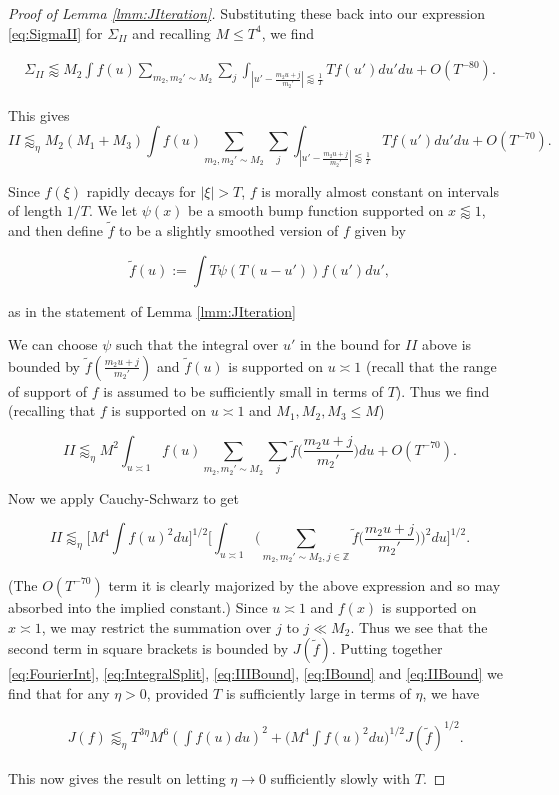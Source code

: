 \documentclass{amsart}
\theoremstyle{plain}
\numberwithin{equation}{section}
\renewcommand{\tilde}{\widetilde}
\begin{document}
\begin{proof}[Proof of  Lemma \ref{lmm:JIteration}]
Substituting these back into our expression \eqref{eq:SigmaII} for $\Sigma_{II}$ and recalling $M\le T^4$, we find

\begin{align*}
\Sigma_{II}\lessapprox M_2\int f(u) \sum_{m_2, m_2' \sim M_2}\sum_{j}   \int_{|u' - \frac{m_2 u + j}{m_2'} | \lessapprox \frac{1}{T}} T f(u') du' du+O(T^{-80}).
\end{align*}

This gives
\[ II\lessapprox_\eta M_2 (M_1 + M_3)  \int f(u)  \sum_{m_2, m_2' \sim M_2}\sum_{j}  \int_{|u' - \frac{m_2 u + j}{m_2'} | \lessapprox \frac{1}{T}}  T f(u') du' du+O(T^{-70}). \]

Since $\widehat{f}(\xi)$ rapidly decays for $|\xi|>T$, $f$ is morally almost constant on intervals of length $1/T$. We let $\psi(x)$ be a smooth bump function supported on $x\lessapprox 1$, and then define $\tilde{f}$ to be a slightly smoothed version of $f$ given by 

\[
\tilde{f}(u) := \int T \psi( T(u - u') ) f(u') du',
\]

as in the statement of Lemma \ref{lmm:JIteration}

We can choose $\psi$ such that the integral over $u'$ in the bound for $II$ above is bounded by $\tilde{f} (\frac{m_2u+j}{m_2'})$ and $\tilde{f}(u)$ is supported on $u\asymp 1$ (recall that the range of support of $f$ is assumed to be sufficiently small in terms of $T$). Thus we find (recalling that $f$ is supported on $u\asymp 1$ and $M_1,M_2,M_3\le M$)

\[
 II \lessapprox_\eta  M^2 \int_{u\asymp 1} f(u)  \sum_{m_2, m_2' \sim M_2}\sum_{ j} \tilde{f} \Big( \frac{m_2 u + j}{m_2'} \Big) du+O(T^{-70}).
 \]

Now we apply Cauchy-Schwarz to get

\begin{equation}
II \lessapprox_\eta \Big[ M^4 \int f(u)^2 du \Big]^{1/2} \Big[ \int_{u\asymp 1} \Big( \sum_{m_2, m_2' \sim M_2,  j \in \mathbb{Z}} \tilde{f} \Big( \frac{m_2 u + j}{m_2'} \Big) \Big)^2 du\Big]^{1/2}. \label{eq:IIBound}
\end{equation}

(The $O(T^{-70})$ term it is clearly majorized by the above expression and so may absorbed into the implied constant.) Since $u\asymp 1$ and $f(x)$ is supported on $x\asymp 1$, we may restrict the summation over $j$ to $j\ll M_2$. Thus we see that the second term in square brackets is bounded by $J(\tilde{f})$. Putting together \eqref{eq:FourierInt}, \eqref{eq:IntegralSplit}, \eqref{eq:IIIBound}, \eqref{eq:IBound} and \eqref{eq:IIBound} we find that for any $\eta>0$, provided $T$ is sufficiently large in terms of $\eta$, we have

\begin{align*}
& J(f)\lessapprox_\eta  T^{3\eta}M^6 \left( \int f(u) du \right)^2+ \Big( M^4 \int f(u)^2 du\Big)^{1/2}J(\tilde{f})^{1/2}.
\end{align*}

This now gives the result on letting $\eta\rightarrow 0$ sufficiently slowly with $T$.
\end{proof}
\end{document}
